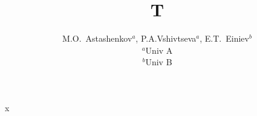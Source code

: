 \documentclass{article}
\begin{document}
\title{T}
\author{M.O.\, Astashenkov$^{a}$, P.A.Vshivtseva$^{a}$, E.T.\, Einiev$^{b}$ \\
$^{a}$Univ A \\ $^{b}$Univ B}
\maketitle
x
\end{document}
